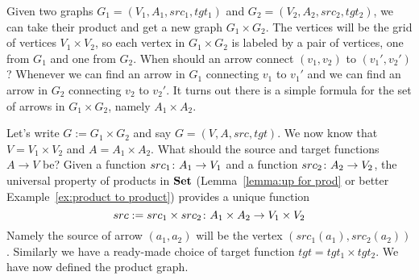\documentclass[CT4S-EN-RU]{subfiles}
\begin{document}
\begin{exampleENG}\label{ex:product of graphs}
Given two graphs $G_1=(V_1,A_1,src_1,tgt_1)$ and $G_2=(V_2,A_2,src_2,tgt_2)$, we can take their product and get a new graph $G_1\times G_2$. The vertices will be the grid of vertices $V_1\times V_2$, so each vertex in $G_1\times G_2$ is labeled by a pair of vertices, one from $G_1$ and one from $G_2$. When should an arrow connect $(v_1,v_2)$ to $(v_1',v_2')$? Whenever we can find an arrow in $G_1$ connecting $v_1$ to $v_1'$ and we can find an arrow in $G_2$ connecting $v_2$ to $v_2'$. It turns out there is a simple formula for the set of arrows in $G_1\times G_2$, namely $A_1\times A_2$.

Let's write $G:=G_1\times G_2$ and say $G=(V,A,src,tgt)$. We now know that $V=V_1\times V_2$ and $A=A_1\times A_2$. What should the source and target functions $A\to V$ be? Given a function $src_1\colon A_1\rightarrow V_1$ and a function $src_2\colon A_2\rightarrow V_2$, the universal property of products in ${\mathbf{Set}}$ (Lemma~\ref{lemma:up for prod} or better Example~\ref{ex:product to product}) provides a unique function 
$$src:=src_1\times src_2\colon A_1\times A_2\rightarrow V_1\times V_2$$ 
Namely the source of arrow $(a_1,a_2)$ will be the vertex $(src_1(a_1),src_2(a_2))$. Similarly we have a ready-made choice of target function $tgt=tgt_1\times tgt_2$. We have now defined the product graph.


\end{exampleENG}
\end{document}
